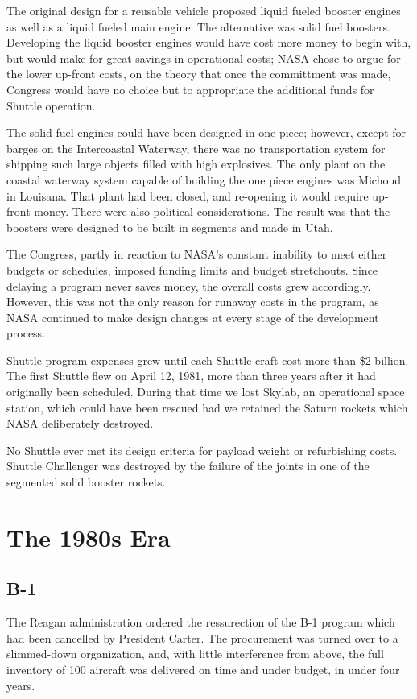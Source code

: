 The original design for a reusable vehicle proposed liquid fueled booster engines as well as a liquid fueled main engine. The alternative was solid fuel boosters. Developing the liquid booster engines would have cost more money to begin with, but would make for great savings in operational costs; NASA chose to argue for the lower up-front costs, on the theory that once the committment was made, Congress would have no choice but to appropriate the additional funds for Shuttle operation.

The solid fuel engines could have been designed in one piece; however, except for barges on the Intercoastal Waterway, there was no transportation system for shipping such large objects filled with high explosives. The only plant on the coastal waterway system capable of building the one piece engines was Michoud in Louisana. That plant had been closed, and re-opening it would require up-front money. There were also political considerations. The result was that the boosters were designed to be built in segments and made in Utah.

The Congress, partly in reaction to NASA's constant inability to meet either budgets or schedules, imposed funding limits and budget stretchouts. Since delaying a program never saves money, the overall costs grew accordingly. However, this was not the only reason for runaway costs in the program, as NASA continued to make design changes at every stage of the development process.

Shuttle program expenses grew until each Shuttle craft cost more than \$2 billion. The first Shuttle flew on April 12, 1981, more than three years after it had originally been scheduled. During that time we lost Skylab, an operational space station, which could have been rescued had we retained the Saturn rockets which NASA deliberately destroyed.

No Shuttle ever met its design criteria for payload weight or refurbishing costs. Shuttle Challenger was destroyed by the failure of the joints in one of the segmented solid booster rockets.

\section{The 1980s Era}
\subsection{B-1}
The Reagan administration ordered the ressurection of the B-1 program which had been cancelled by President Carter. The procurement was turned over to a slimmed-down organization, and, with little interference from above, the full inventory of 100 aircraft was delivered on time and under budget, in under four years.

